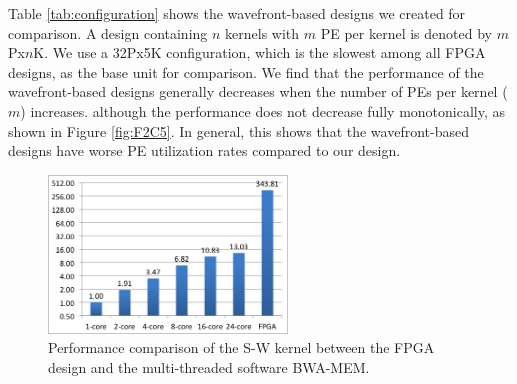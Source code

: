 Table \ref{tab:configuration} shows the wavefront-based designs we created for comparison. 
A design containing $n$ kernels with $m$ PE per kernel is denoted by $m$Px$n$K. 
We use a 32Px5K configuration, which is the slowest among all FPGA designs, as the base unit for comparison.
We find that the performance of the wavefront-based designs generally decreases when the number of PEs per kernel ($m$) increases.
although the performance does not decrease fully monotonically, as shown in Figure \ref{fig:F2C5}.
In general, this shows that the wavefront-based designs have worse PE utilization rates compared to our design. 

\begin{figure}[!hbt]
	\begin{center}
		\includegraphics[width=2.5in]{Figures/F1C5.jpg}
		\caption {Performance comparison of the S-W kernel between the FPGA design and the multi-threaded software BWA-MEM.}
		\label{fig:F1C5}
	\end{center}
\end{figure}
\vspace{-10pt}




